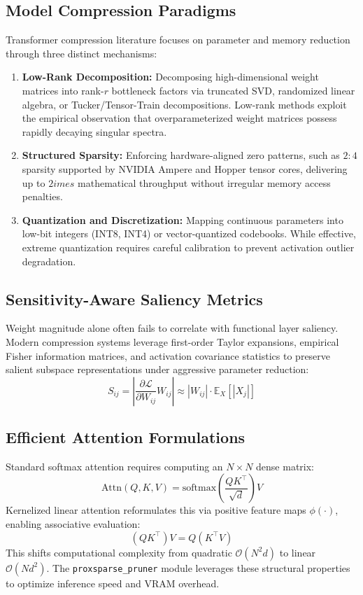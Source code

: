 \subsection{Model Compression Paradigms}
Transformer compression literature focuses on parameter and memory reduction through three distinct mechanisms:
\begin{enumerate}
\item \textbf{Low-Rank Decomposition:} Decomposing high-dimensional weight matrices into rank-$r$ bottleneck factors via truncated SVD, randomized linear algebra, or Tucker/Tensor-Train decompositions. Low-rank methods exploit the empirical observation that overparameterized weight matrices possess rapidly decaying singular spectra.
\item \textbf{Structured Sparsity:} Enforcing hardware-aligned zero patterns, such as $2:4$ sparsity supported by NVIDIA Ampere and Hopper tensor cores, delivering up to $2	imes$ mathematical throughput without irregular memory access penalties.
\item \textbf{Quantization and Discretization:} Mapping continuous parameters into low-bit integers (INT8, INT4) or vector-quantized codebooks. While effective, extreme quantization requires careful calibration to prevent activation outlier degradation.
\end{enumerate}

\subsection{Sensitivity-Aware Saliency Metrics}
Weight magnitude alone often fails to correlate with functional layer saliency. Modern compression systems leverage first-order Taylor expansions, empirical Fisher information matrices, and activation covariance statistics to preserve salient subspace representations under aggressive parameter reduction:
\[
S_{ij} = \left| \frac{\partial \mathcal{L}}{\partial W_{ij}} W_{ij} \right| \approx |W_{ij}| \cdot \mathbb{E}_{X}[|X_j|]
\]

\subsection{Efficient Attention Formulations}
Standard softmax attention requires computing an $N \times N$ dense matrix:
\[
\text{Attn}(Q, K, V) = \text{softmax}\left(\frac{Q K^\top}{\sqrt{d}}\right) V
\]
Kernelized linear attention reformulates this via positive feature maps $\phi(\cdot)$, enabling associative evaluation:
\[
(Q K^\top) V = Q (K^\top V)
\]
This shifts computational complexity from quadratic $\mathcal{O}(N^2 d)$ to linear $\mathcal{O}(N d^2)$. The \texttt{proxsparse\_pruner} module leverages these structural properties to optimize inference speed and VRAM overhead.



